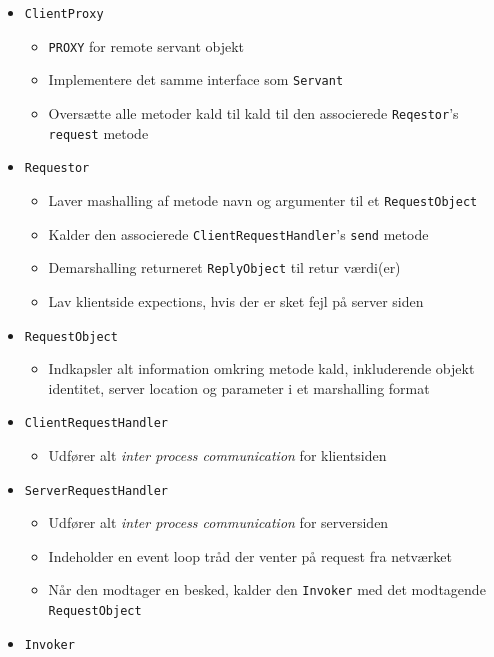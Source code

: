 \documentclass[a4, english]{article}
\begin{document}
\begin{itemize}
	\item \texttt{ClientProxy}
  \begin{itemize}
  	\item \texttt{PROXY} for remote servant objekt
    \item Implementere det samme interface som \texttt{Servant}
    \item Oversætte alle metoder kald til kald til den associerede \texttt{Reqestor}'s \texttt{request} metode
  \end{itemize}
  \item \texttt{Requestor}
  \begin{itemize}
  	\item Laver mashalling af metode navn og argumenter til et \texttt{RequestObject}
    \item Kalder den associerede \texttt{ClientRequestHandler}'s \texttt{send} metode
    \item Demarshalling returneret \texttt{ReplyObject} til retur værdi(er)
    \item Lav klientside expections, hvis der er sket fejl på server siden 
  \end{itemize}
  \item \texttt{RequestObject}
  \begin{itemize}
  	\item Indkapsler alt information omkring metode kald, inkluderende objekt identitet, server location og parameter i et marshalling format  
  \end{itemize}
  \item \texttt{ClientRequestHandler}
  \begin{itemize}
  	\item Udfører alt \textit{inter process communication} for klientsiden 
  \end{itemize}
  \item \texttt{ServerRequestHandler}
  \begin{itemize}
  	\item Udfører alt \textit{inter process communication} for serversiden 
    \item Indeholder en event loop tråd der venter på request fra netværket 
    \item Når den modtager en besked, kalder den \texttt{Invoker} med det modtagende \texttt{RequestObject}
  \end{itemize}
  \item \texttt{Invoker}
  \begin{itemize}

\end{itemize}
\end{itemize}
\end{document}
